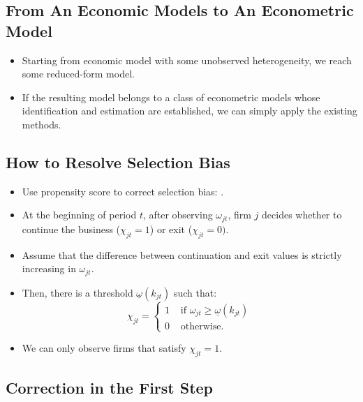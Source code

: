 \documentclass[
]{book}
\providecommand{\tightlist}{%
  \setlength{\itemsep}{0pt}\setlength{\parskip}{0pt}}
\begin{document}
\hypertarget{from-an-economic-models-to-an-econometric-model}{%
\subsection{From An Economic Models to An Econometric Model}\label{from-an-economic-models-to-an-econometric-model}}

\begin{itemize}
\tightlist
\item
  Starting from economic model with some unobserved heterogeneity, we reach some reduced-form model.
\item
  If the resulting model belongs to a class of econometric models whose identification and estimation are established, we can simply apply the existing methods.
\end{itemize}

\hypertarget{how-to-resolve-selection-bias}{%
\subsection{How to Resolve Selection Bias}\label{how-to-resolve-selection-bias}}

\begin{itemize}
\tightlist
\item
  Use propensity score to correct selection bias: \citet{Ahn1993}.
\item
  At the beginning of period \(t\), after observing \(\omega_{jt}\), firm \(j\) decides whether to continue the business (\(\chi_{jt} = 1\)) or exit (\(\chi_{jt} = 0)\).
\item
  Assume that the difference between continuation and exit values is strictly increasing in \(\omega_{jt}\).
\item
  Then, there is a threshold \(\underline{\omega}(k_{jt})\) such that:
  \begin{equation}
  \chi_{jt} = 
  \begin{cases}
  1 &\text{   if   } \omega_{jt} \ge \underline{\omega}(k_{jt})\\
  0 &\text{   otherwise.}
  \end{cases}
  \end{equation}
\item
  We can only observe firms that satisfy \(\chi_{jt} = 1\).
\end{itemize}

\hypertarget{correction-in-the-first-step}{%
\subsection{Correction in the First Step}\label{correction-in-the-first-step}}
\end{document}
